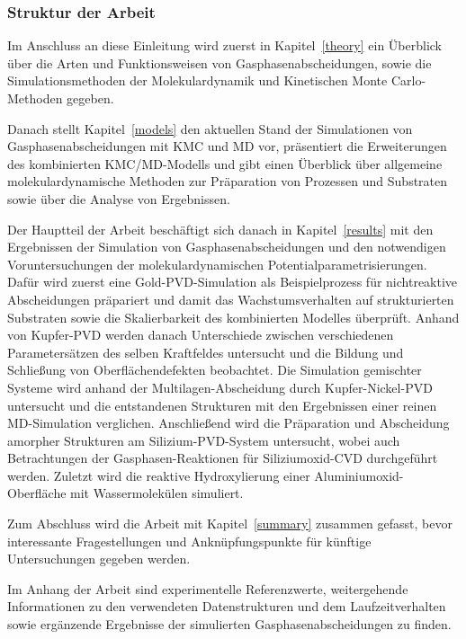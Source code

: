 \subsubsection{Struktur der Arbeit}

Im Anschluss an diese Einleitung wird zuerst in Kapitel~\ref{theory} ein Überblick über die Arten und Funktionsweisen von Gasphasenabscheidungen, sowie die Simulationsmethoden der Molekulardynamik und Kinetischen Monte Carlo-Methoden gegeben.

Danach stellt Kapitel~\ref{models} den aktuellen Stand der Simulationen von Gasphasenabscheidungen mit KMC und MD vor, präsentiert die Erweiterungen des kombinierten KMC/MD-Modells und gibt einen Überblick über allgemeine molekulardynamische Methoden zur Präparation von Prozessen und Substraten sowie über die Analyse von Ergebnissen.

Der Hauptteil der Arbeit beschäftigt sich danach in Kapitel~\ref{results} mit den Ergebnissen der Simulation von Gasphasenabscheidungen und den notwendigen Voruntersuchungen der molekulardynamischen Potentialparametrisierungen.
Dafür wird zuerst eine Gold-PVD-Simulation als Beispielprozess für nichtreaktive Abscheidungen präpariert und damit das Wachstumsverhalten auf strukturierten Substraten sowie die Skalierbarkeit des kombinierten Modelles überprüft.
Anhand von Kupfer-PVD werden danach Unterschiede zwischen verschiedenen Parametersätzen des selben Kraftfeldes untersucht und die Bildung und Schließung von Oberflächendefekten beobachtet.
Die Simulation gemischter Systeme wird anhand der Multilagen-Abscheidung durch Kupfer-Nickel-PVD untersucht und die entstandenen Strukturen mit den Ergebnissen einer reinen MD-Simulation verglichen.
Anschließend wird die Präparation und Abscheidung amorpher Strukturen am Silizium-PVD-System untersucht, wobei auch Betrachtungen der Gasphasen-Reaktionen für Siliziumoxid-CVD durchgeführt werden.
Zuletzt wird die reaktive Hydroxylierung einer Aluminiumoxid-Oberfläche mit Wassermolekülen simuliert.

Zum Abschluss wird die Arbeit mit Kapitel~\ref{summary} zusammen gefasst, bevor interessante Fragestellungen und Anknüpfungspunkte für künftige Untersuchungen gegeben werden.

Im Anhang der Arbeit sind experimentelle Referenzwerte, weitergehende Informationen zu den verwendeten Datenstrukturen und dem Laufzeitverhalten sowie ergänzende Ergebnisse der simulierten Gasphasenabscheidungen zu finden.
